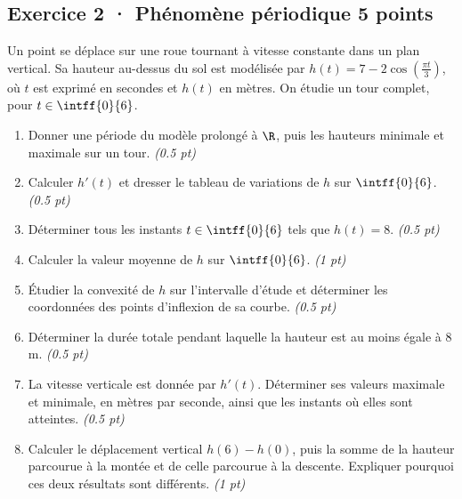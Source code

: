 \subsection*{Exercice 2 · Phénomène périodique \hfill 5 points}Un point se déplace sur une roue tournant à vitesse constante dans un plan vertical. Sa hauteur au-dessus du sol est modélisée par $h(t)=7-2\cos\left(\frac{\pi t}{3}\right)$, où $t$ est exprimé en secondes et $h(t)$ en mètres. On étudie un tour complet, pour $t\in\intff{0}{6}$.

\begin{enumerate}

\item Donner une période du modèle prolongé à $\R$, puis les hauteurs minimale et maximale sur un tour. \hfill\textit{(\num{0,5} pt)}

\item Calculer $h'(t)$ et dresser le tableau de variations de $h$ sur $\intff{0}{6}$. \hfill\textit{(\num{0,5} pt)}

\item Déterminer tous les instants $t\in\intff{0}{6}$ tels que $h(t)=8$. \hfill\textit{(\num{0,5} pt)}

\item Calculer la valeur moyenne de $h$ sur $\intff{0}{6}$. \hfill\textit{(1 pt)}

\item Étudier la convexité de $h$ sur l'intervalle d'étude et déterminer les coordonnées des points d'inflexion de sa courbe. \hfill\textit{(\num{0,5} pt)}

\item Déterminer la durée totale pendant laquelle la hauteur est au moins égale à $8$ m. \hfill\textit{(\num{0,5} pt)}

\item La vitesse verticale est donnée par $h'(t)$. Déterminer ses valeurs maximale et minimale, en mètres par seconde, ainsi que les instants où elles sont atteintes. \hfill\textit{(\num{0,5} pt)}

\item Calculer le déplacement vertical $h(6)-h(0)$, puis la somme de la hauteur parcourue à la montée et de celle parcourue à la descente. Expliquer pourquoi ces deux résultats sont différents. \hfill\textit{(1 pt)}

\end{enumerate}

\mxnewpage{}

